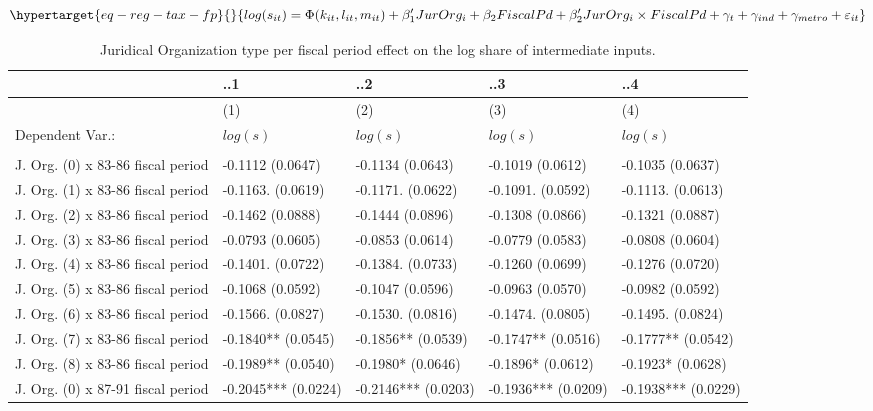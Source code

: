 \documentclass[
  12pt]{article}
\begin{document}
\begin{equation}\protect\hypertarget{eq-reg-tax-fp}{}{
log(s_{it})= \Phi(k_{it},l_{it},m_{it})+ \mathbf{\beta}_1'JurOrg_i + \beta_2FiscalPd+\beta_2'JurOrg_i\times FiscalPd + \gamma_t + \gamma_{ind} +\gamma_{metro} + \varepsilon_{it}
}\label{eq-reg-tax-fp}\end{equation}

\hypertarget{tbl-reg-fiscal-p}{}
\begin{table}
\caption{\label{tbl-reg-fiscal-p}Juridical Organization type per fiscal period effect on the log share of
intermediate inputs. }\tabularnewline

\centering
\begin{tabular}[t]{l|l|l|l|l}
\hline
 & ..1 & ..2 & ..3 & ..4\\
\hline
 & (1) & (2) & (3) & (4)\\
\hline
Dependent Var.: & \(log(s)\) & \(log(s)\) & \(log(s)\) & \(log(s)\)\\
\hline
 &  &  &  & \\
\hline
J. Org. (0) x 83-86 fiscal period & -0.1112 (0.0647) & -0.1134 (0.0643) & -0.1019 (0.0612) & -0.1035 (0.0637)\\
\hline
J. Org. (1) x 83-86 fiscal period & -0.1163. (0.0619) & -0.1171. (0.0622) & -0.1091. (0.0592) & -0.1113. (0.0613)\\
\hline
J. Org. (2) x 83-86 fiscal period & -0.1462 (0.0888) & -0.1444 (0.0896) & -0.1308 (0.0866) & -0.1321 (0.0887)\\
\hline
J. Org. (3) x 83-86 fiscal period & -0.0793 (0.0605) & -0.0853 (0.0614) & -0.0779 (0.0583) & -0.0808 (0.0604)\\
\hline
J. Org. (4) x 83-86 fiscal period & -0.1401. (0.0722) & -0.1384. (0.0733) & -0.1260 (0.0699) & -0.1276 (0.0720)\\
\hline
J. Org. (5) x 83-86 fiscal period & -0.1068 (0.0592) & -0.1047 (0.0596) & -0.0963 (0.0570) & -0.0982 (0.0592)\\
\hline
J. Org. (6) x 83-86 fiscal period & -0.1566. (0.0827) & -0.1530. (0.0816) & -0.1474. (0.0805) & -0.1495. (0.0824)\\
\hline
J. Org. (7) x 83-86 fiscal period & -0.1840** (0.0545) & -0.1856** (0.0539) & -0.1747** (0.0516) & -0.1777** (0.0542)\\
\hline
J. Org. (8) x 83-86 fiscal period & -0.1989** (0.0540) & -0.1980* (0.0646) & -0.1896* (0.0612) & -0.1923* (0.0628)\\
\hline
J. Org. (0) x 87-91 fiscal period & -0.2045*** (0.0224) & -0.2146*** (0.0203) & -0.1936*** (0.0209) & -0.1938*** (0.0229)\\

\end{tabular}
\end{table}
\end{document}
